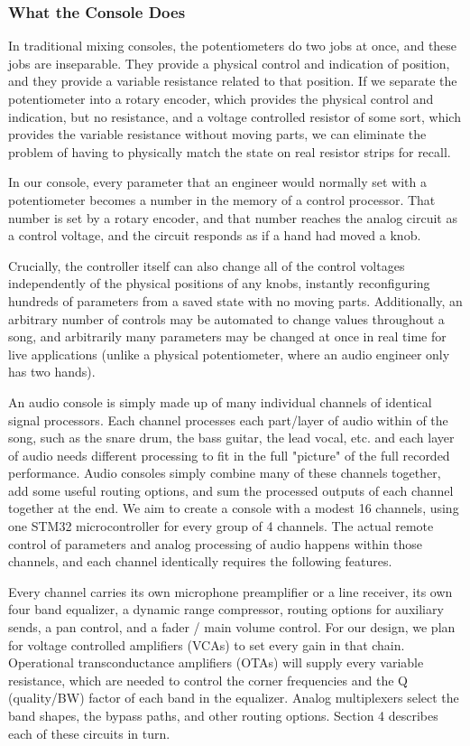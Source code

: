 \documentclass[11pt, letterpaper,titlepage]{article}
\begin{document}
\subsubsection*{What the Console Does}

In traditional mixing consoles, the potentiometers do two jobs at once, and these jobs are inseparable. They provide a physical control and indication of position, and they provide a variable resistance related to that position. If we separate the potentiometer into a rotary encoder, which provides the physical control and indication, but no resistance, and a voltage controlled resistor of some sort, which provides the variable resistance without moving parts, we can eliminate the problem of having to physically match the state on real resistor strips for recall.


In our console, every parameter that an engineer would normally set with a potentiometer becomes a number in the memory of a control processor. That number is set by a rotary encoder, and that number reaches the analog
circuit as a control voltage, and the circuit responds as if a hand had moved a
knob.

Crucially, the controller itself can also change all of the control voltages independently of the physical positions of any knobs, instantly reconfiguring hundreds of parameters from a saved state with no moving parts. Additionally, an arbitrary number of controls may be automated to change values throughout a song, and arbitrarily many parameters may be changed at once in real time for live applications (unlike a physical potentiometer, where an audio engineer only has two hands).

An audio console is simply made up of many individual channels of identical signal processors. Each channel processes each part/layer of audio within of the song, such as the snare drum, the bass guitar, the lead vocal, etc. and each layer of audio needs different processing to fit in the full "picture" of the full recorded performance. Audio consoles simply combine many of these channels together, add some useful routing options, and sum the processed outputs of each channel together at the end. We aim to create a console with a modest 16 channels, using one STM32 microcontroller for every group of 4 channels. The actual remote control of parameters and analog processing of audio happens within those channels, and each channel identically requires the following features.

Every channel carries its own microphone preamplifier or a line receiver, its own four band
equalizer, a dynamic range compressor, routing options for auxiliary sends, a pan control, and a fader / main volume control. For our design, we plan for voltage
controlled amplifiers (VCAs) to set every gain in that chain. Operational transconductance
amplifiers (OTAs) will supply every variable resistance, which are needed to control the corner frequencies
and the Q (quality/BW) factor of each band in the equalizer. Analog multiplexers select the band shapes, the
bypass paths, and other routing options. Section 4
describes each of these circuits in turn.
\end{document}

